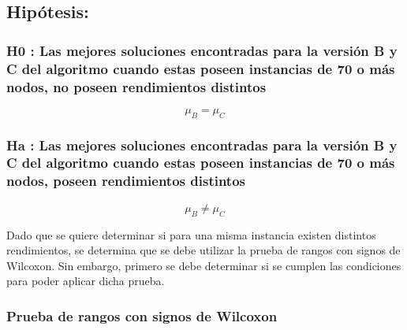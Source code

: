 \documentclass[
]{article}
\begin{document}
\hypertarget{hipuxf3tesis-1}{%
\subsection{Hipótesis:}\label{hipuxf3tesis-1}}

\hypertarget{h0-las-mejores-soluciones-encontradas-para-la-versiuxf3n-b-y-c-del-algoritmo-cuando-estas-poseen-instancias-de-70-o-muxe1s-nodos-no-poseen-rendimientos-distintos}{%
\subsubsection{\texorpdfstring{\textbf{H0 : Las mejores soluciones
encontradas para la versión B y C del algoritmo cuando estas poseen
instancias de 70 o más nodos, no poseen rendimientos
distintos}}{H0 : Las mejores soluciones encontradas para la versión B y C del algoritmo cuando estas poseen instancias de 70 o más nodos, no poseen rendimientos distintos}}\label{h0-las-mejores-soluciones-encontradas-para-la-versiuxf3n-b-y-c-del-algoritmo-cuando-estas-poseen-instancias-de-70-o-muxe1s-nodos-no-poseen-rendimientos-distintos}}

\[ \mu_B  = \mu_C \]

\hypertarget{ha-las-mejores-soluciones-encontradas-para-la-versiuxf3n-b-y-c-del-algoritmo-cuando-estas-poseen-instancias-de-70-o-muxe1s-nodos-poseen-rendimientos-distintos}{%
\subsubsection{\texorpdfstring{\textbf{Ha : Las mejores soluciones
encontradas para la versión B y C del algoritmo cuando estas poseen
instancias de 70 o más nodos, poseen rendimientos
distintos}}{Ha : Las mejores soluciones encontradas para la versión B y C del algoritmo cuando estas poseen instancias de 70 o más nodos, poseen rendimientos distintos}}\label{ha-las-mejores-soluciones-encontradas-para-la-versiuxf3n-b-y-c-del-algoritmo-cuando-estas-poseen-instancias-de-70-o-muxe1s-nodos-poseen-rendimientos-distintos}}

\[ \mu_B \neq \mu_C \]

Dado que se quiere determinar si para una misma instancia existen
distintos rendimientos, se determina que se debe utilizar la prueba de
rangos con signos de Wilcoxon. Sin embargo, primero se debe determinar
si se cumplen las condiciones para poder aplicar dicha prueba.

\hypertarget{prueba-de-rangos-con-signos-de-wilcoxon}{%
\subsubsection{Prueba de rangos con signos de
Wilcoxon}\label{prueba-de-rangos-con-signos-de-wilcoxon}}
\end{document}
